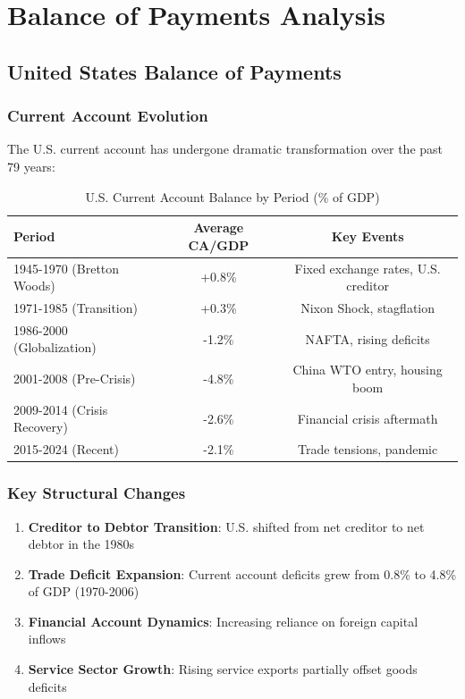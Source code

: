 \documentclass[11pt,a4paper]{article}
\begin{document}
\section{Balance of Payments Analysis}

\subsection{United States Balance of Payments}

\subsubsection{Current Account Evolution}
The U.S. current account has undergone dramatic transformation over the past 79 years:

\begin{table}[h]
\centering
\caption{U.S. Current Account Balance by Period (\% of GDP)}
\begin{tabular}{lcc}
\toprule
\textbf{Period} & \textbf{Average CA/GDP} & \textbf{Key Events} \\
\midrule
1945-1970 (Bretton Woods) & +0.8\% & Fixed exchange rates, U.S. creditor \\
1971-1985 (Transition) & +0.3\% & Nixon Shock, stagflation \\
1986-2000 (Globalization) & -1.2\% & NAFTA, rising deficits \\
2001-2008 (Pre-Crisis) & -4.8\% & China WTO entry, housing boom \\
2009-2014 (Crisis Recovery) & -2.6\% & Financial crisis aftermath \\
2015-2024 (Recent) & -2.1\% & Trade tensions, pandemic \\
\bottomrule
\end{tabular}
\end{table}

\subsubsection{Key Structural Changes}
\begin{enumerate}
    \item \textbf{Creditor to Debtor Transition}: U.S. shifted from net creditor to net debtor in the 1980s
    \item \textbf{Trade Deficit Expansion}: Current account deficits grew from 0.8\% to 4.8\% of GDP (1970-2006)
    \item \textbf{Financial Account Dynamics}: Increasing reliance on foreign capital inflows
    \item \textbf{Service Sector Growth}: Rising service exports partially offset goods deficits
\end{enumerate}
\end{document}
